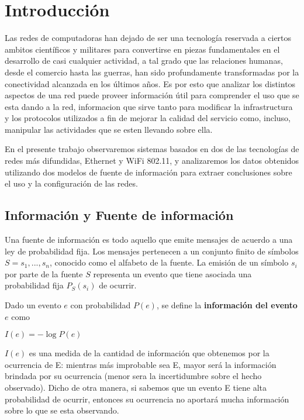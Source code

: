 \section{Introducción}

Las redes de computadoras han dejado de ser 
una tecnología reservada a ciertos ambitos científicos y militares para convertirse
en piezas fundamentales en el desarrollo de casi cualquier actividad, a tal grado que las relaciones humanas, 
desde el comercio hasta las guerras, han sido profundamente transformadas por la conectividad
alcanzada en los últimos años.  
Es por esto que analizar los distintos aspectos de una red
puede proveer información útil para comprender el uso que se esta dando a la red, informacion que sirve tanto para
modificar la infrastructura y los protocolos
utilizados a fin de mejorar la calidad del servicio como, incluso,  manipular las actividades que se esten llevando sobre ella.


En el presente trabajo observaremos sistemas basados en dos de las tecnologías de redes más difundidas, Ethernet y WiFi 802.11, y analizaremos los datos obtenidos utilizando dos modelos de fuente de información para extraer conclusiones sobre el uso y la configuración de las redes.


\subsection{Información y Fuente de información}

Una fuente de información es todo aquello que emite mensajes de acuerdo a una ley de probabilidad fija. Los mensajes pertenecen a un conjunto finito de símbolos $S={s_{1},...,s_{n}}$, conocido como el alfabeto de la fuente. La emisión de un símbolo $s_i$ por parte de la fuente $S$ representa un evento que tiene asociada una probabilidad fija $P_S(s_i)$ de ocurrir. 

Dado un evento $e$ con probabilidad $P(e)$, se define la \textbf{información del evento $e$} como

\begin{center}
$I(e)=-\log{P(e)}$ 
\end{center}

$I(e)$ es una medida de la cantidad de información que obtenemos por la ocurrencia de E: mientras más improbable sea E, mayor será la información brindada por su ocurrencia (menor sera la incertidumbre sobre el hecho observado). Dicho de otra manera, si sabemos que un evento E tiene alta probabilidad de ocurrir, entonces su ocurrencia no aportará mucha información sobre lo que se esta observando.



